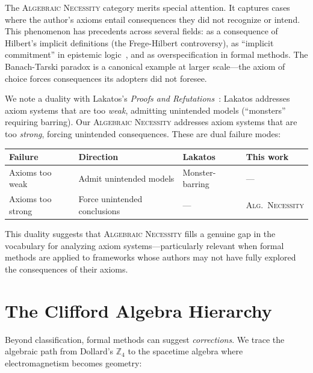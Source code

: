 \documentclass[runningheads]{llncs}
\begin{document}
The \textsc{Algebraic Necessity} category merits special attention. It captures
cases where the author's axioms entail consequences they did not recognize or
intend. This phenomenon has precedents across several fields: as a consequence
of Hilbert's implicit definitions (the Frege-Hilbert controversy), as
``implicit commitment'' in epistemic logic~\cite{fagin1988belief}, and as
overspecification in formal methods. The Banach-Tarski paradox is a canonical
example at larger scale---the axiom of choice forces consequences its adopters
did not foresee.

We note a duality with Lakatos's \emph{Proofs and
Refutations}~\cite{lakatos1976}: Lakatos addresses axiom systems that are too
\emph{weak}, admitting unintended models (``monsters'' requiring barring). Our
\textsc{Algebraic Necessity} addresses axiom systems that are too \emph{strong},
forcing unintended consequences. These are dual failure modes:

\begin{center}
\small
\begin{tabular}{@{}llll@{}}
\toprule
\textbf{Failure} & \textbf{Direction} & \textbf{Lakatos} & \textbf{This work} \\
\midrule
Axioms too weak & Admit unintended models & Monster-barring & --- \\
Axioms too strong & Force unintended conclusions & --- & \textsc{Alg.\ Necessity} \\
\bottomrule
\end{tabular}
\end{center}

This duality suggests that \textsc{Algebraic Necessity} fills a genuine gap in
the vocabulary for analyzing axiom systems---particularly relevant when formal
methods are applied to frameworks whose authors may not have fully explored the
consequences of their axioms.

\section{The Clifford Algebra Hierarchy}
\label{sec:hierarchy}

Beyond classification, formal methods can suggest \emph{corrections}. We trace
the algebraic path from Dollard's $\mathbb{Z}_4$ to the spacetime algebra where
electromagnetism becomes geometry:
\end{document}

